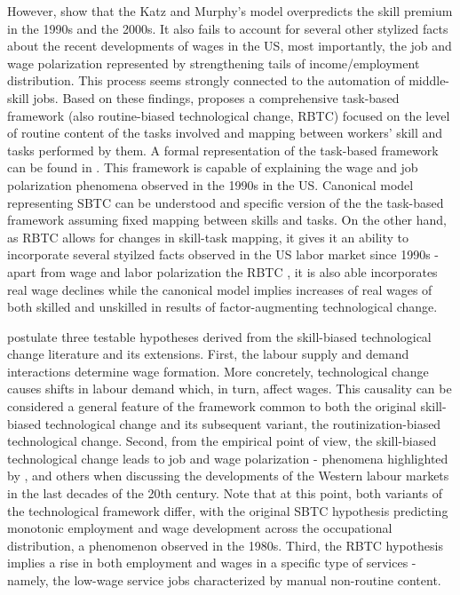 \documentclass[11pt]{article}
\begin{document}
However, \citet{acemoglu2011skills} show that the Katz and Murphy's model overpredicts the skill premium in the 1990s and the 2000s. It also fails to account for several other stylized facts about the recent developments of wages in the US, most importantly, the job and wage polarization represented by strengthening tails of income/employment distribution. This process seems strongly connected to the automation of middle-skill jobs. Based on these findings, \citet{acemoglu2012does} proposes a comprehensive task-based framework (also routine-biased technological change, RBTC) focused on the level of routine content of the tasks involved and mapping between workers' skill and tasks performed by them. A formal representation of the task-based framework can be found in \citet{acemoglu2011skills}. This framework is capable of explaining the wage and job polarization phenomena observed in the 1990s in the US. 
Canonical model representing SBTC can be understood and specific version of the the task-based framework assuming fixed mapping between skills and tasks.
On the other hand, as RBTC allows for changes in skill-task mapping, it gives it an ability to incorporate several styilzed facts observed in the US labor market since 1990s - apart from wage and labor polarization the RBTC , it is also able incorporates real wage declines while the canonical model implies increases of real wages of both skilled and unskilled in results of factor-augmenting technological change.

\citet{mishel2013assessing} postulate three testable hypotheses derived from the skill-biased technological change literature and its extensions. First, the labour supply and demand interactions determine wage formation. More concretely, technological change causes shifts in labour demand which, in turn, affect wages. This causality can be considered a general feature of the framework common to both the original skill-biased technological change and its subsequent variant, the routinization-biased technological change. Second, from the empirical point of view, the skill-biased technological change leads to job and wage polarization - phenomena highlighted by \citet{acemoglu2012does}, \citet{howell2019declining} and others when discussing the developments of the Western labour markets in the last decades of the 20th century. Note that at this point, both variants of the technological framework differ, with the original SBTC hypothesis predicting monotonic employment and wage development across the occupational distribution, a phenomenon observed in the 1980s. Third, the RBTC hypothesis implies a rise in both employment and wages in a specific type of services - namely, the low-wage service jobs characterized by manual non-routine content.
\end{document}
